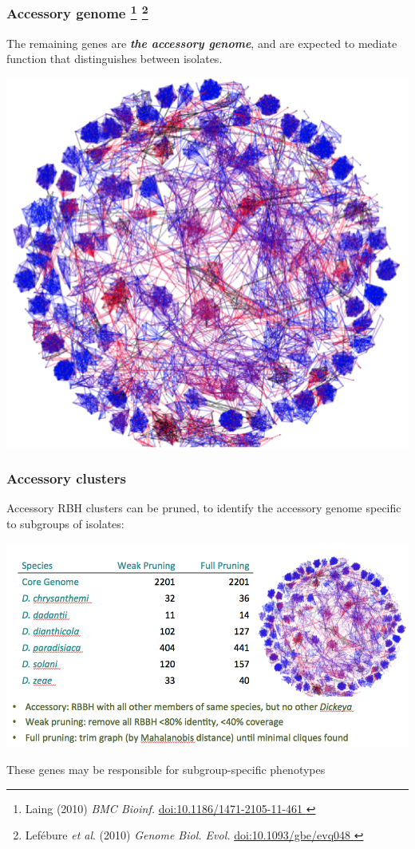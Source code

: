 \begin{frame}
  \frametitle{Accessory genome
    \footnote{\tiny{Laing (2010) \textit{BMC Bioinf.} \href{http://dx.doi.org/10.1186/1471-2105-11-461}{doi:10.1186/1471-2105-11-461
  }}}
    \footnote{\tiny{Lef\'{e}bure \textit{et al}. (2010) \textit{Genome Biol. Evol.} \href{http://dx.doi.org/10.1371/10.1093/gbe/evq048}{doi:10.1093/gbe/evq048
    }}}  
}
  \textcolor{hutton_green}{The remaining genes are \textbf{\textit{the accessory genome}}, and are expected to mediate function that distinguishes between isolates.}\\[0.2cm]
  \begin{center}
      \includegraphics[height=0.5\textheight]{images/accessory_cluster} 
  \end{center}
\end{frame}

\begin{frame}
  \frametitle{Accessory clusters}
  Accessory RBH clusters can be pruned, to identify the accessory genome specific to subgroups of isolates:
  \begin{center}
      \includegraphics[height=0.55\textheight]{images/dickeya_accessory} 
  \end{center}
  \textcolor{hutton_green}{These genes may be responsible for subgroup-specific phenotypes}
\end{frame}

